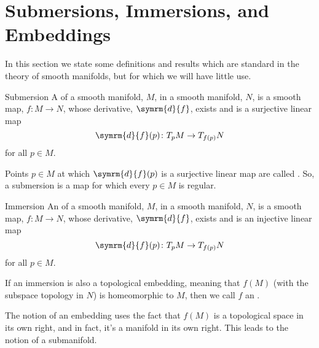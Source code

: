 \documentclass[fleqn]{NotesClass}
\renewcommand{\dl}{\symrm{d}}
\begin{document}
    \section{Submersions, Immersions, and Embeddings}
    In this section we state some definitions and results which are standard in the theory of smooth manifolds, but for which we will have little use.
    
    \begin{dfn}{Submersion}{}
        A  of a smooth manifold, \(M\), in a smooth manifold, \(N\), is a smooth map, \(f \colon M \to N\), whose derivative, \(\dl{f}\), exists and is a surjective linear map
        \begin{equation}
            \dl{f}(p) \colon T_pM \to T_{f(p)}N
        \end{equation}
        for all \(p \in M\).
        
        Points \(p \in M\) at which \(\dl{f}(p)\) is a surjective linear map are called .
        So, a submersion is a map for which every \(p \in M\) is regular.
    \end{dfn}
    
    \begin{dfn}{Immersion}{}
        An  of a smooth manifold, \(M\), in a smooth manifold, \(N\), is a smooth map, \(f \colon M \to N\), whose derivative, \(\dl{f}\), exists and is an injective linear map
        \begin{equation}
            \dl{f}(p) \colon T_pM \to T_{f(p)}N
        \end{equation}
        for all \(p \in M\).
        
        If an immersion is also a topological embedding, meaning that \(f(M)\) (with the subspace topology in \(N\)) is homeomorphic to \(M\), then we call \(f\) an .
    \end{dfn}
    
    The notion of an embedding uses the fact that \(f(M)\) is a topological space in its own right, and in fact, it's a manifold in its own right.
    This leads to the notion of a submanifold.
    
\end{document}
